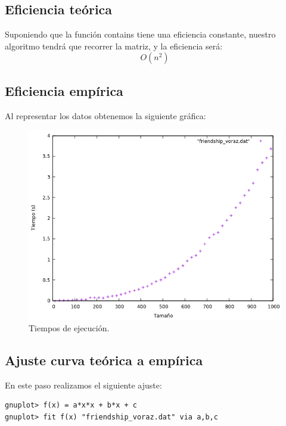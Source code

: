 \subsection{Eficiencia teórica}
Suponiendo que la función contains tiene una eficiencia constante, nuestro algoritmo tendrá que recorrer la matriz, y la eficiencia será:
  \begin{equation}
      O(n^2)
  \end{equation}

\subsection{Eficiencia empírica}

Al representar los datos obtenemos la siguiente gráfica:

\begin{figure}[H]
    \begin{center}
        \includegraphics[scale=0.7]{imagenes/voraz.png}
        \caption{Tiempos de ejecución.}
        \label{fig2}
    \end{center}
\end{figure}

\subsection{Ajuste curva teórica a empírica}

En este paso realizamos el siguiente ajuste:
\begin{shaded*}
\begin{verbatim}
gnuplot> f(x) = a*x*x + b*x + c
gnuplot> fit f(x) "friendship_voraz.dat" via a,b,c
\end{verbatim}
\end{shaded*}

